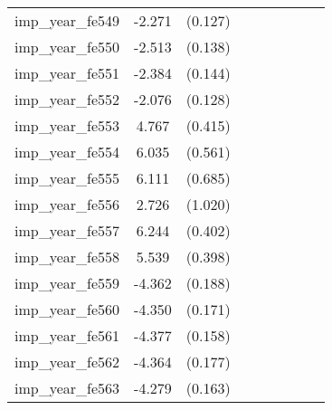 {\begin{tabular}{l*{4}{cc}}
imp\_year\_fe549&   -2.271\sym{***}&  (0.127)&                  &         &                  &         &                  &         \\
imp\_year\_fe550&   -2.513\sym{***}&  (0.138)&                  &         &                  &         &                  &         \\
imp\_year\_fe551&   -2.384\sym{***}&  (0.144)&                  &         &                  &         &                  &         \\
imp\_year\_fe552&   -2.076\sym{***}&  (0.128)&                  &         &                  &         &                  &         \\
imp\_year\_fe553&    4.767\sym{***}&  (0.415)&                  &         &                  &         &                  &         \\
imp\_year\_fe554&    6.035\sym{***}&  (0.561)&                  &         &                  &         &                  &         \\
imp\_year\_fe555&    6.111\sym{***}&  (0.685)&                  &         &                  &         &                  &         \\
imp\_year\_fe556&    2.726\sym{**} &  (1.020)&                  &         &                  &         &                  &         \\
imp\_year\_fe557&    6.244\sym{***}&  (0.402)&                  &         &                  &         &                  &         \\
imp\_year\_fe558&    5.539\sym{***}&  (0.398)&                  &         &                  &         &                  &         \\
imp\_year\_fe559&   -4.362\sym{***}&  (0.188)&                  &         &                  &         &                  &         \\
imp\_year\_fe560&   -4.350\sym{***}&  (0.171)&                  &         &                  &         &                  &         \\
imp\_year\_fe561&   -4.377\sym{***}&  (0.158)&                  &         &                  &         &                  &         \\
imp\_year\_fe562&   -4.364\sym{***}&  (0.177)&                  &         &                  &         &                  &         \\
imp\_year\_fe563&   -4.279\sym{***}&  (0.163)&                  &         &                  &         &                  &         \\

\end{tabular}}
